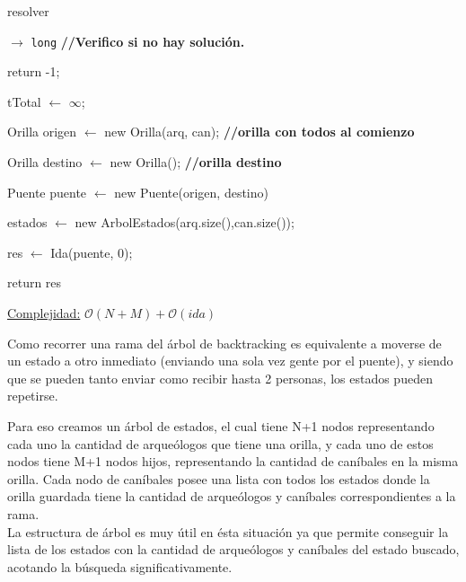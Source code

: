 \begin{algorithm}[H]
\caption{resolver}
\begin{algorithmic}[1]
   $\to $ \texttt{long}
    \State \textbf{//Verifico si no hay solución.}

		\State	return -1;
	\EndIf

	\State	tTotal $\gets$ $\infty$;

	\State	Orilla origen $\gets$ new Orilla(arq, can);	\State \textbf{//orilla con todos al comienzo}

	\State	Orilla destino $\gets$ new Orilla();
	\State \textbf{	//orilla destino}

	\State	Puente puente $\gets$ new Puente(origen, destino)

	\State	estados $\gets$ new ArbolEstados(arq.size(),can.size());

	\State	res $\gets$ Ida(puente, 0);

	\State return res

 \EndProcedure
\end{algorithmic}
\underline{Complejidad:} $\mathcal{O}(N+M) + \mathcal{O}(ida)$

\vspace*{5mm}
\end{algorithm}

Como recorrer una rama del árbol de backtracking es equivalente a moverse de un estado a otro inmediato (enviando una sola vez gente por el puente), y siendo que se pueden tanto enviar como recibir hasta 2 personas, los estados pueden repetirse.

Para eso creamos un árbol de estados, el cual tiene N+1 nodos representando cada uno la cantidad de arqueólogos que tiene una orilla, y cada uno de estos nodos tiene M+1 nodos hijos, representando la cantidad de can\'ibales en la misma orilla.
Cada nodo de can\'ibales posee una lista con todos los estados donde la orilla guardada tiene la cantidad de arqueólogos y caníbales correspondientes a la rama.
\\

La estructura de \'arbol es muy \'util en \'esta situaci\'on ya que permite conseguir la lista de los estados con la cantidad de arque\'ologos y can\'ibales del estado buscado, acotando la b\'usqueda significativamente.

